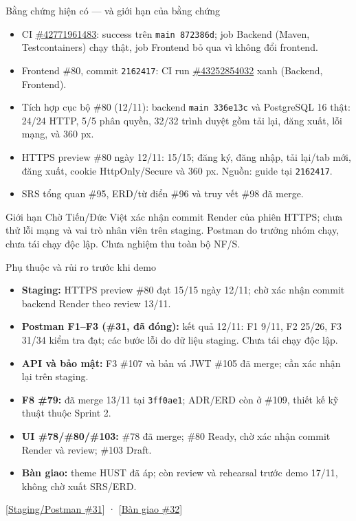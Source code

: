 \documentclass[aspectratio=169,10pt]{beamer}
\begin{document}
\begin{frame}{Bằng chứng hiện có — và giới hạn của bằng chứng}
\small
\begin{itemize}
    \item CI \href{https://github.com/Ktin06/it3180_nhom6_gym_management/actions/runs/42771961483}{\#42771961483}: success trên \texttt{main 872386d}; job Backend (Maven, Testcontainers) chạy thật, job Frontend bỏ qua vì không đổi frontend.
    \item Frontend \#80, commit \texttt{2162417}: CI run \href{https://github.com/Ktin06/it3180_nhom6_gym_management/actions/runs/43252854032}{\#43252854032} xanh (Backend, Frontend).
    \item Tích hợp cục bộ \#80 (12/11): backend \texttt{main 336e13c} và PostgreSQL 16 thật: 24/24 HTTP, 5/5 phân quyền, 32/32 trình duyệt gồm tải lại, đăng xuất, lỗi mạng, và 360 px.
    \item HTTPS preview \#80 ngày 12/11: 15/15; đăng ký, đăng nhập, tải lại/tab mới, đăng xuất, cookie HttpOnly/Secure và 360 px. Nguồn: guide tại \texttt{2162417}.
    \item SRS tổng quan \#95, ERD/từ điển \#96 và truy vết \#98 đã merge.
  \end{itemize}
  \begin{alertblock}{Giới hạn}
    Chờ Tiến/Đức Việt xác nhận commit Render của phiên HTTPS; chưa thử lỗi mạng và vai trò nhân viên trên staging. Postman do trưởng nhóm chạy, chưa tái chạy độc lập. Chưa nghiệm thu toàn bộ NF/S.
  \end{alertblock}
\end{frame}

\begin{frame}{Phụ thuộc và rủi ro trước khi demo}
\small
  \begin{itemize}
    \item \textbf{Staging:} HTTPS preview \#80 đạt 15/15 ngày 12/11; chờ xác nhận commit backend Render theo review 13/11.
    \item \textbf{Postman F1--F3 (\#31, đã đóng):} kết quả 12/11: F1 9/11, F2 25/26, F3 31/34 kiểm tra đạt; các bước lỗi do dữ liệu staging. Chưa tái chạy độc lập.
    \item \textbf{API và bảo mật:} F3 \#107 và bản vá JWT \#105 đã merge; cần xác nhận lại trên staging.
    \item \textbf{F8 \#79:} đã merge 13/11 tại \texttt{3ff0ae1}; ADR/ERD còn ở \#109, thiết kế kỹ thuật thuộc Sprint 2.
    \item \textbf{UI \#78/\#80/\#103:} \#78 đã merge; \#80 Ready, chờ xác nhận commit Render và review; \#103 Draft.
    \item \textbf{Bàn giao:} theme HUST đã áp; còn review và rehearsal trước demo 17/11, không chờ xuất SRS/ERD.
  \end{itemize}
  \scriptsize [\href{https://github.com/Ktin06/it3180_nhom6_gym_management/issues/31}{Staging/Postman \#31}] · [\href{https://github.com/Ktin06/it3180_nhom6_gym_management/issues/32}{Bàn giao \#32}]
\end{frame}
\end{document}
